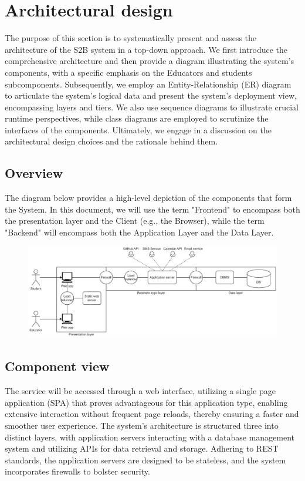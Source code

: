 \documentclass[12pt, a4paper]{report}
\begin{document}
\chapter{Architectural design}
    The purpose of this section is to systematically present and assess the architecture of the S2B system in a top-down approach. 
    We first introduce the comprehensive architecture and then provide a diagram illustrating the system's components, with a specific emphasis on the Educators and students subcomponents. 
    Subsequently, we employ an Entity-Relationship (ER) diagram to articulate the system's logical data and present the system's deployment view, encompassing layers and tiers. 
    We also use sequence diagrams to illustrate crucial runtime perspectives, while class diagrams are employed to scrutinize the interfaces of the components. 
    Ultimately, we engage in a discussion on the architectural design choices and the rationale behind them.
    \section{Overview}
    The diagram below provides a high-level depiction of the components that form the System. 
    In this document, we will use the term "Frontend" to encompass both the presentation layer and the Client 
    (e.g., the Browser), while the term "Backend" will encompass both the Application Layer and the Data Layer.
    \begin{figure}[H]
        \centering
        \includegraphics[width=1.0\linewidth]{images/high_level_architecture.png}
    \end{figure}
    \section{Component view}
    The service will be accessed through a web interface, utilizing a single page application (SPA) that proves advantageous for this application type, 
    enabling extensive interaction without frequent page reloads, thereby ensuring a faster and smoother user experience. 
    The system's architecture is structured three into distinct layers, with application servers interacting 
    with a database management system and utilizing APIs for data retrieval and storage. Adhering to REST standards, 
    the application servers are designed to be stateless, and the system incorporates firewalls to bolster security.
\end{document}
